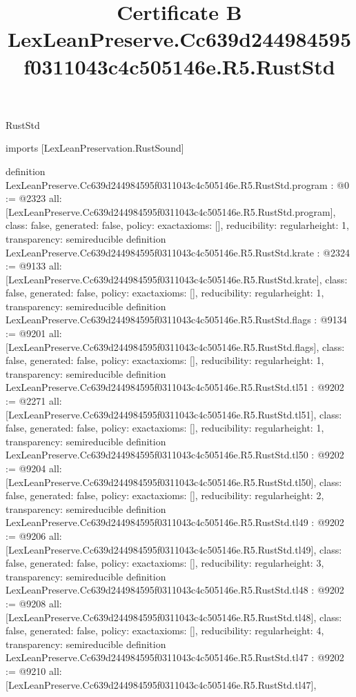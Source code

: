 \begin{lexlean}{RustStd}
\title{Certificate B LexLeanPreserve.Cc639d244984595f0311043c4c505146e.R5.RustStd}
\begin{coremodule}
imports [LexLeanPreservation.RustSound]

definition LexLeanPreserve.Cc639d244984595f0311043c4c505146e.R5.RustStd.program : @0 := @2323 {
  all: [LexLeanPreserve.Cc639d244984595f0311043c4c505146e.R5.RustStd.program],
  class: false,
  generated: false,
  policy: exact{axioms: []},
  reducibility: regular{height: 1},
  transparency: semireducible
}
definition LexLeanPreserve.Cc639d244984595f0311043c4c505146e.R5.RustStd.krate : @2324 := @9133 {
  all: [LexLeanPreserve.Cc639d244984595f0311043c4c505146e.R5.RustStd.krate],
  class: false,
  generated: false,
  policy: exact{axioms: []},
  reducibility: regular{height: 1},
  transparency: semireducible
}
definition LexLeanPreserve.Cc639d244984595f0311043c4c505146e.R5.RustStd.flags : @9134 := @9201 {
  all: [LexLeanPreserve.Cc639d244984595f0311043c4c505146e.R5.RustStd.flags],
  class: false,
  generated: false,
  policy: exact{axioms: []},
  reducibility: regular{height: 1},
  transparency: semireducible
}
definition LexLeanPreserve.Cc639d244984595f0311043c4c505146e.R5.RustStd.tl51 : @9202 := @2271 {
  all: [LexLeanPreserve.Cc639d244984595f0311043c4c505146e.R5.RustStd.tl51],
  class: false,
  generated: false,
  policy: exact{axioms: []},
  reducibility: regular{height: 1},
  transparency: semireducible
}
definition LexLeanPreserve.Cc639d244984595f0311043c4c505146e.R5.RustStd.tl50 : @9202 := @9204 {
  all: [LexLeanPreserve.Cc639d244984595f0311043c4c505146e.R5.RustStd.tl50],
  class: false,
  generated: false,
  policy: exact{axioms: []},
  reducibility: regular{height: 2},
  transparency: semireducible
}
definition LexLeanPreserve.Cc639d244984595f0311043c4c505146e.R5.RustStd.tl49 : @9202 := @9206 {
  all: [LexLeanPreserve.Cc639d244984595f0311043c4c505146e.R5.RustStd.tl49],
  class: false,
  generated: false,
  policy: exact{axioms: []},
  reducibility: regular{height: 3},
  transparency: semireducible
}
definition LexLeanPreserve.Cc639d244984595f0311043c4c505146e.R5.RustStd.tl48 : @9202 := @9208 {
  all: [LexLeanPreserve.Cc639d244984595f0311043c4c505146e.R5.RustStd.tl48],
  class: false,
  generated: false,
  policy: exact{axioms: []},
  reducibility: regular{height: 4},
  transparency: semireducible
}
definition LexLeanPreserve.Cc639d244984595f0311043c4c505146e.R5.RustStd.tl47 : @9202 := @9210 {
  all: [LexLeanPreserve.Cc639d244984595f0311043c4c505146e.R5.RustStd.tl47],
}
\end{coremodule}
\end{lexlean}
